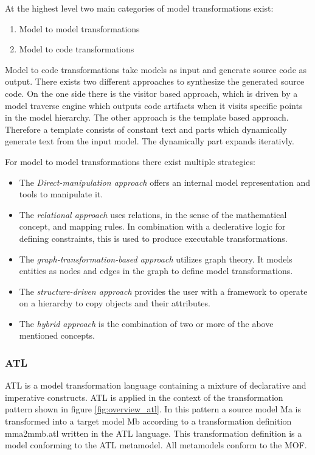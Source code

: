 \documentclass{llncs}
\begin{document}
At the highest level two main categories of model transformations exist:\cite{Czarnecki03}

\begin{enumerate}
	\item Model to model transformations
	\item Model to code transformations
\end{enumerate}

Model to code transformations take models as input and generate source code as output. There exists two different approaches to synthesize the generated source code. On the one side there is the visitor based approach, which is driven by a model traverse engine which outputs code artifacts when it visits specific points in the model hierarchy. The other approach is the template based approach. Therefore a template consists of constant text and parts which dynamically generate text from the input model. The dynamically part expands iterativly.\cite{Czarnecki03}


For model to model transformations there exist multiple strategies:

\begin{itemize}
	\item The \emph{Direct-manipulation approach} offers an internal model representation and tools to manipulate it.
	\item The \emph{relational approach} uses relations, in the sense of the mathematical concept, and mapping rules. In combination with a declerative logic for defining constraints, this is used to produce executable transformations.
	\item The \emph{graph-transformation-based approach} utilizes graph theory. It models entities as nodes and edges in the graph to define model transformations.
	\item The \emph{structure-driven approach} provides the user with a framework to operate on a hierarchy to copy objects and their attributes.
	\item The  \emph{hybrid approach} is the combination of two or more of the above mentioned concepts.
\end{itemize}

\subsubsection{ATL}

ATL is a model transformation language containing a mixture of declarative and
imperative constructs. ATL is applied in the context of the
transformation pattern shown in figure \ref{fig:overview_atl}. In this pattern a source
model Ma is transformed into a target model Mb according to a transformation definition mma2mmb.atl written in the ATL language. This transformation definition is a model conforming to the ATL metamodel. All metamodels conform to the MOF.
\end{document}
